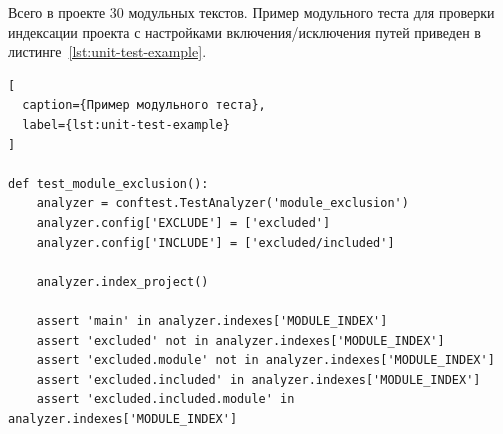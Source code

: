 Всего в проекте 30 модульных текстов. Пример модульного теста для проверки
индексации проекта с настройками включения/исключения путей приведен в
листинге~\ref{lst:unit-test-example}.

\begin{lstlisting}[
  caption={Пример модульного теста},
  label={lst:unit-test-example}
]

def test_module_exclusion():
    analyzer = conftest.TestAnalyzer('module_exclusion')
    analyzer.config['EXCLUDE'] = ['excluded']
    analyzer.config['INCLUDE'] = ['excluded/included']

    analyzer.index_project()

    assert 'main' in analyzer.indexes['MODULE_INDEX']
    assert 'excluded' not in analyzer.indexes['MODULE_INDEX']
    assert 'excluded.module' not in analyzer.indexes['MODULE_INDEX']
    assert 'excluded.included' in analyzer.indexes['MODULE_INDEX']
    assert 'excluded.included.module' in analyzer.indexes['MODULE_INDEX']

\end{lstlisting}
